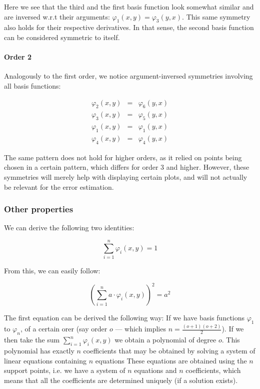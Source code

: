 \documentclass{article}
\renewcommand{\phi}{\varphi}
\begin{document}
Here we see that the third and the first basis function look somewhat similar and are inversed w.r.t their arguments: $\phi_1(x,y)=\phi_3(y,x)$. This same symmetry also holds for their respective derivatives. In that sense, the second basis function can be considered symmetric to itself.

\paragraph{Order 2}

Analogously to the first order, we notice argument-inversed symmetries involving all basis functions:

\begin{eqnarray*}
  \phi_2(x,y) & = & \phi_6(y,x) \\
  \phi_3(x,y) & = & \phi_5(y,x) \\
  \phi_1(x,y) & = & \phi_1(y,x) \\
  \phi_4(x,y) & = & \phi_4(y,x)
\end{eqnarray*}

The same pattern does not hold for higher orders, as it relied on points being chosen in a certain pattern, which differs for order 3 and higher. However, these symmetries will merely help with displaying certain plots, and will not actually be relevant for the error estimation.

\subsubsection{Other properties}
\label{sec:basis-functions-other-properties}

We can derive the following two identities:

\begin{equation}
  \label{eq:sum-basis-functions-is-1}
  \sum_{i=1}^n \phi_i(x,y) = 1
\end{equation}

From this, we can easily follow:

\begin{equation}
  \label{eq:sum-basis-functions-squared}
  \left( \sum_{i=1}^n a \cdot \phi_i(x,y) \right)^2 = a^2
\end{equation}

The first equation can be derived the following way: If we have basis functions $\phi_1$ to $\phi_n$, of a certain orer (say order $o$ --- which implies $n=\frac{(o+1)(o+2)}{2}$). If we then take the sum $\sum_{i=1}^n \phi_i(x,y)$ we obtain a polynomial of degree $o$. This polynomial has exactly $n$ coefficients that may be obtained by solving a system of linear equations containing $n$ equations These equations are obtained using the $n$ support points, i.e. we have a system of $n$ equations and $n$ coefficients, which means that all the coefficients are determined uniquely (if a solution exists).
\end{document}
